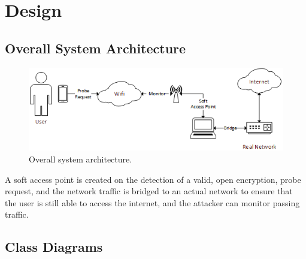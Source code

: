 \section{Design}
\subsection{Overall System Architecture}
\begin{figure}[h!]
\centering\includegraphics[width=\linewidth]{design/figures/overall.png}
\caption{Overall system architecture.}
\end{figure}
A soft access point is created on the detection of a valid, open encryption, probe request, and the network traffic is bridged to an actual network to ensure that the user is still able to access the internet, and the attacker can monitor passing traffic.

\subsection{Class Diagrams}
